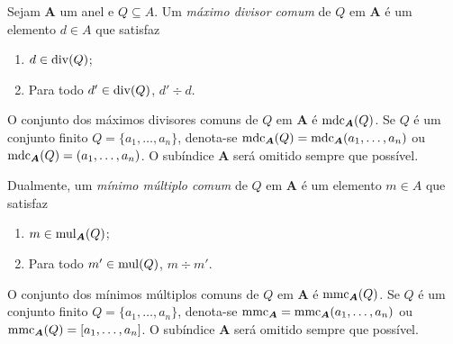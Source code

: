 

\begin{defi}
Sejam $\bm A$ um anel e $Q \subseteq A$. Um \emph{máximo divisor comum} de $Q$ em $\bm A$ é um elemento $d \in A$ que satisfaz
	\begin{enumerate}
	\item $d \in \operatorname{div}(Q)$;
	\item Para todo $d' \in \operatorname{div}(Q)$, $d' \div d$.
	\end{enumerate}
O conjunto dos máximos divisores comuns de $Q$ em $\bm A$ é $\operatorname{mdc}_{\bm A}(Q)$. Se $Q$ é um conjunto finito $Q=\{a_1,\ldots,a_n\}$, denota-se	$\operatorname{mdc}_{\bm A}(Q)=\operatorname{mdc}_{\bm A}(a_1,\ldots,a_n)$ ou $\operatorname{mdc}_{\bm A}(Q)=(a_1,\ldots,a_n)$. O subíndice $\bm A$ será omitido sempre que possível.

Dualmente, um \emph{mínimo múltiplo comum} de $Q$ em $\bm A$ é um elemento $m \in A$ que satisfaz
	\begin{enumerate}
	\item $m \in \operatorname{mul}_{\bm A}(Q)$;
	\item Para todo $m' \in \operatorname{mul}(Q)$, $m \div m'$.
	\end{enumerate}
	O conjunto dos mínimos múltiplos comuns de $Q$ em $\bm A$ é $\operatorname{mmc}_{\bm A}(Q)$. Se $Q$ é um conjunto finito $Q=\{a_1, \ldots, a_n\}$, denota-se $\operatorname{mmc}_{\bm A} = \operatorname{mmc}_{\bm A}(a_1, \ldots, a_n)$ ou $\operatorname{mmc}_{\bm A}(Q) = [a_1, \ldots, a_n]$. O subíndice $\bm A$ será omitido sempre que possível.
\end{defi}

